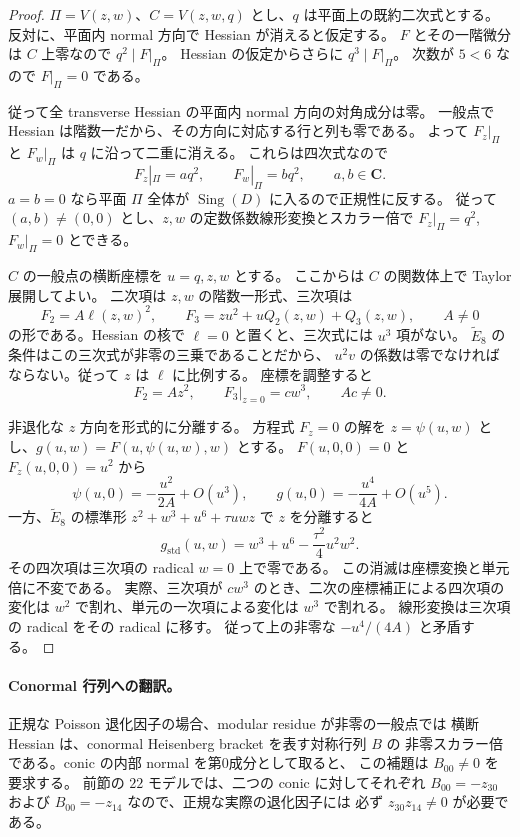 \documentclass[11pt,a4paper]{ltjsarticle}
\newcommand{\CC}{\mathbf C}\newcommand{\QQ}{\mathbf Q}
\theoremstyle{remark}\newtheorem{remark}[theorem]{注意}
\begin{document}
\begin{proof}
$\Pi=V(z,w)$、$C=V(z,w,q)$ とし、$q$ は平面上の既約二次式とする。
反対に、平面内 normal 方向で Hessian が消えると仮定する。
$F$ とその一階微分は $C$ 上零なので $q^2\mid F|_\Pi$。
Hessian の仮定からさらに $q^3\mid F|_\Pi$。
次数が $5<6$ なので $F|_\Pi=0$ である。

従って全 transverse Hessian の平面内 normal 方向の対角成分は零。
一般点で Hessian は階数一だから、その方向に対応する行と列も零である。
よって $F_z|_\Pi$ と $F_w|_\Pi$ は $q$ に沿って二重に消える。
これらは四次式なので
\[
 F_z|_\Pi=a q^2,\qquad F_w|_\Pi=b q^2,\qquad a,b\in\CC.
\]
$a=b=0$ なら平面 $\Pi$ 全体が $\operatorname{Sing}(D)$ に入るので正規性に反する。
従って $(a,b)\ne(0,0)$ とし、$z,w$ の定数係数線形変換とスカラー倍で
$F_z|_\Pi=q^2$, $F_w|_\Pi=0$ とできる。

$C$ の一般点の横断座標を $u=q,z,w$ とする。
ここからは $C$ の関数体上で Taylor 展開してよい。
二次項は $z,w$ の階数一形式、三次項は
\[
 F_2=A\ell(z,w)^2,\qquad
 F_3=z u^2+u Q_2(z,w)+Q_3(z,w),\qquad A\ne0
\]
の形である。Hessian の核で $\ell=0$ と置くと、三次式には $u^3$ 項がない。
$\widetilde E_8$ の条件はこの三次式が非零の三乗であることだから、
$u^2v$ の係数は零でなければならない。従って $z$ は $\ell$ に比例する。
座標を調整すると
\[
 F_2=A z^2,\qquad F_3|_{z=0}=c w^3,\qquad A c\ne0.
\]

非退化な $z$ 方向を形式的に分離する。
方程式 $F_z=0$ の解を $z=\psi(u,w)$ とし、$g(u,w)=F(u,\psi(u,w),w)$ とする。
$F(u,0,0)=0$ と $F_z(u,0,0)=u^2$ から
\[
 \psi(u,0)=-\frac{u^2}{2A}+O(u^3),\qquad
 g(u,0)=-\frac{u^4}{4A}+O(u^5).
\]
一方、$\widetilde E_8$ の標準形
$z^2+w^3+u^6+\tau uwz$ で $z$ を分離すると
\[
 g_{\mathrm{std}}(u,w)=w^3+u^6-\frac{\tau^2}{4}u^2w^2.
\]
その四次項は三次項の radical $w=0$ 上で零である。
この消滅は座標変換と単元倍に不変である。
実際、三次項が $c w^3$ のとき、二次の座標補正による四次項の変化は
$w^2$ で割れ、単元の一次項による変化は $w^3$ で割れる。
線形変換は三次項の radical をその radical に移す。
従って上の非零な $-u^4/(4A)$ と矛盾する。
\end{proof}

\paragraph{Conormal 行列への翻訳。}
正規な Poisson 退化因子の場合、modular residue が非零の一般点では
横断 Hessian は、conormal Heisenberg bracket を表す対称行列 $B$ の
非零スカラー倍である。conic の内部 normal を第0成分として取ると、
この補題は $B_{00}\ne0$ を要求する。
前節の $22$ モデルでは、二つの conic に対してそれぞれ
$B_{00}=-z_{30}$ および $B_{00}=-z_{14}$ なので、正規な実際の退化因子には
必ず $z_{30}z_{14}\ne0$ が必要である。
\end{document}

